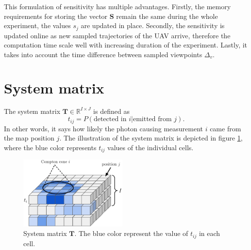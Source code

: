 This formulation of sensitivity has multiple advantages.
Firstly, the memory requirements for storing the vector $\mathbf{S}$ remain the same during the whole experiment, the values $s_{j}$ are updated in place.
Secondly, the sensitivity is updated online as new sampled trajectories of the \ac{UAV} arrive, therefore the computation time scale well with increasing duration of the experiment.
Lastly, it takes into account the time difference between sampled viewpoints $\Delta_{v}$.%

\section{System matrix}
\label{sec:system}
The system matrix $\mathbf{T} \in \mathbb{R}^{I \times J}$ is defined as
\begin{equation}
t_{ij} =  P(\textrm{detected in } i | \textrm{emitted from } j).
\end{equation}
In other words, it says how likely the photon causing measurement $i$ came from the map position $j$.
The illustration of the system matrix is depicted in figure \ref{fig:sys_ilustration}, where the blue color represents $t_{ij}$ values of the individual cells. 
\begin{figure}[!h]
  \centering
    \includegraphics[width=0.48\textwidth]{./fig/photos/systemmmm.eps}
  \caption{System matrix $\mathbf{T}$. The blue color represent the value of $t_{ij}$ in each cell.}
    \label{fig:sys_ilustration}
\end{figure}


